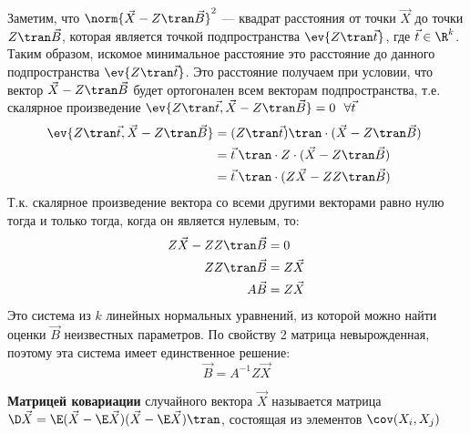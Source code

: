 Заметим, что \(\norm{\vec{X} - Z\tran \vec{B}}^2\) --- квадрат расстояния от точки \(\vec{X}\) до точки \(Z\tran \vec{B}\), которая является точкой подпространства \(\ev{Z\tran \vec{t}}\), где \(\vec{t} \in \R^k\). Таким образом, искомое минимальное расстояние это расстояние до данного подпространства \(\ev{Z\tran \vec{t}}\). Это расстояние получаем при условии, что вектор \(\vec{X} - Z\tran \vec{B}\) будет ортогонален всем векторам подпространства, т.е. скалярное произведение \(\ev{Z\tran \vec{t}, \vec{X} - Z\tran \vec{B}} = 0 \ \ \forall \vec{t}\)
\begin{align*}
    \ev{Z\tran \vec{t}, \vec{X} - Z\tran \vec{B}}
     & = (Z\tran \vec{t})\tran \cdot (\vec{X} - Z\tran \vec{B})\ \\
     & = \vec{t}\:\tran \cdot Z \cdot (\vec{X} - Z\tran \vec{B}) \\
     & = \vec{t}\:\tran \cdot (Z\vec{X} - ZZ\tran \vec{B})
\end{align*}
Т.к. скалярное произведение вектора со всеми другими векторами равно нулю тогда и только тогда, когда он является нулевым, то:
\begin{align*}
    Z\vec{X} - ZZ\tran \vec{B} & = 0        \\
    ZZ\tran \vec{B}            & = Z\vec{X} \\
    A \vec{B}                  & = Z\vec{X}
\end{align*}
Это система из \(k\) линейных нормальных уравнений, из которой можно найти оценки \(\vec{B}\) неизвестных параметров. По свойству 2 матрица невырожденная, поэтому эта система имеет единственное решение:
\[\vec{B} = A^{-1}Z \vec{X}\]

\begin{definition}
    \textbf{Матрицей ковариации} случайного вектора \(\vec{X}\) называется матрица \(\D \vec{X} = \E(\vec{X} - \E \vec{X})(\vec{X} - \E \vec{X})\tran\), состоящая из элементов \(\cov(X_i, X_j)\)
\end{definition}

